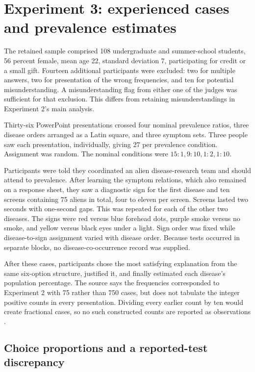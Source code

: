 \section{Experiment 3: experienced cases and prevalence estimates}
\label{sec:p19-explanation-experiment-three}

The retained sample comprised 108 undergraduate and summer-school
students, 56 percent female, mean age 22, standard deviation 7,
participating for credit or a small gift.
Fourteen additional participants were excluded: two for multiple
answers, two for presentation of the wrong frequencies, and ten
for potential misunderstanding. A misunderstanding flag from
either one of the judges was sufficient for that exclusion.
This differs from retaining misunderstandings in Experiment 2's
main analysis.

Thirty-six PowerPoint presentations crossed four nominal prevalence
ratios, three disease orders arranged as a Latin square, and three
symptom sets. Three people saw each presentation, individually,
giving 27 per prevalence condition. Assignment was random.
The nominal conditions were \(15:1,9:10,1:2,1:10\).

Participants were told they coordinated an alien disease-research
team and should attend to prevalence. After learning the symptom
relations, which also remained on a response sheet, they saw a
diagnostic sign for the first disease and ten screens containing
75 aliens in total, four to eleven per screen. Screens lasted
two seconds with one-second gaps. This was repeated for each
of the other two diseases. The signs were red versus blue forehead
dots, purple smoke versus no smoke, and yellow versus black eyes
under a light. Sign order was fixed while disease-to-sign assignment
varied with disease order.
Because tests occurred in separate blocks, no disease-co-occurrence
record was supplied.

After these cases, participants chose the most satisfying explanation
from the same six-option structure, justified it, and finally
estimated each disease's population percentage.
The source says the frequencies corresponded to Experiment 2
with 75 rather than 750 cases, but does not tabulate the integer
positive counts in every presentation. Dividing every earlier
count by ten would create fractional cases, so no such constructed
counts are reported as observations
\cite[pp.~245--246]{Lombrozo2007SimplicityProbability}.

\subsection{Choice proportions and a reported-test discrepancy}


